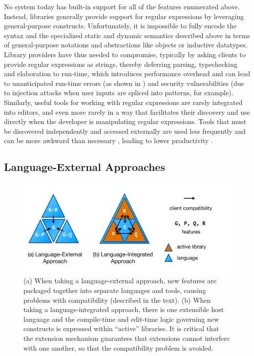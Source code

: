 No system today has built-in support for all of the features enumerated above. Instead, libraries generally provide support for regular expressions by leveraging  general-purpose constructs. Unfortunately, it is impossible to fully encode the syntax and the specialized static and dynamic semantics described above in terms of general-purpose notations and abstractions like objects or inductive datatypes. Library providers have thus needed to compromise, typically by asking clients to provide regular expressions as strings, thereby deferring parsing, typechecking and elaboration to run-time, which introduces performance overhead and can lead to unanticipated run-time errors (as shown in \cite{spishak2012type}) and security vulnerabilities (due to injection attacks when user inputs are spliced into patterns, for example). Similarly, useful tools for working with regular expressions are rarely integrated into editors, and even more rarely in a way that facilitates their discovery and use directly when the developer is manipulating regular expressions. Tools that must be discovered independently and accessed externally are used less frequently  and can be more awkward than necessary \cite{Campbell:2008:DRT:1636642.1636651, Omar:2012:ACC:2337223.2337324}, leading to lower productivity \cite{Omar:2012:ACC:2337223.2337324}.

\subsection{Language-External Approaches}
\begin{figure}
\begin{center}
\includegraphics[scale=.48]{approaches.pdf}
\end{center}
\vspace{-20px}
\caption{\small (a) When taking a language-external approach, new features are packaged together into separate languages and tools, causing problems with compatibility (described in the text). (b) When taking a language-integrated approach, there is one extensible host language and the compile-time and edit-time logic governing new constructs is expressed within ``active'' libraries. It is critical that the extension mechanism  guarantees that extensions cannot interfere with one another, so that the compatibility problem is avoided.}
\label{approaches}
\end{figure}

